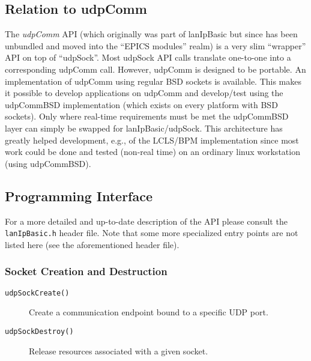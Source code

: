 \documentclass{article}
\newcommand{\lip}{lanIpBasic}
\newcommand{\lipc}[1]{{\tt #1}}
\begin{document}
  \subsection{Relation to udpComm}
  The {\em udpComm} API (which originally was part of \lip{} but 
  since has been unbundled and moved into the ``EPICS modules''
  realm) is a very slim ``wrapper'' API on top of ``udpSock''.
  Most udpSock API calls translate one-to-one into a corresponding
  udpComm call. However, udpComm is designed to be portable.
  An implementation of udpComm using regular BSD
  sockets is available. This makes it possible to develop applications
  on udpComm and develop/test using the udpCommBSD implementation
  (which exists on every platform with BSD sockets). Only where
  real-time requirements must be met the udpCommBSD layer can
  simply be swapped for \lip{}/udpSock. This architecture has
  greatly helped development, e.g., of the LCLS/BPM implementation
  since most work could be done and tested (non-real time) on
  an ordinary linux workstation (using udpCommBSD).

  \subsection{Programming Interface}
  For a more detailed and up-to-date description of the 
  API please consult the \lipc{lanIpBasic.h} header file.
  Note that some more specialized entry points are not
  listed here (see the aforementioned header file).

  \subsubsection{Socket Creation and Destruction}
  \begin{description}
  \item[\lipc{udpSockCreate()}] Create a communication endpoint
  bound to a specific UDP port.
  \item[\lipc{udpSockDestroy()}] Release resources associated with
  a given socket.
  \end{description}
\end{document}

